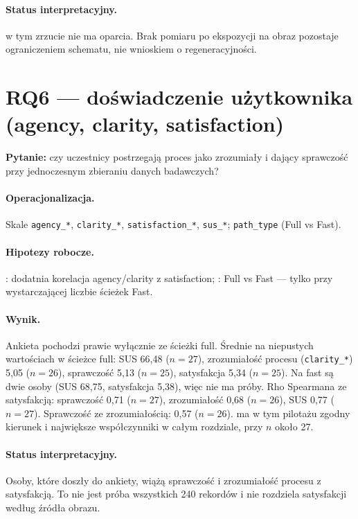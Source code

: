 \paragraph{Status interpretacyjny.}
 w tym zrzucie nie ma oparcia. Brak pomiaru po ekspozycji na obraz pozostaje ograniczeniem schematu, nie wnioskiem o regeneracyjności.

\section{RQ6 --- doświadczenie użytkownika (agency, clarity, satisfaction)}
\label{ch08:sec:rq6}

\textbf{Pytanie:} czy uczestnicy postrzegają proces jako zrozumiały i dający sprawczość przy jednoczesnym zbieraniu danych badawczych?

\paragraph{Operacjonalizacja.}
Skale \texttt{agency\_*}, \texttt{clarity\_*}, \texttt{satisfaction\_*}, \texttt{sus\_*}; \texttt{path\_type} (Full vs Fast).

\paragraph{Hipotezy robocze.}
: dodatnia korelacja agency/clarity z satisfaction; : Full vs Fast --- tylko przy wystarczającej liczbie ścieżek Fast.

\paragraph{Wynik.}
Ankieta pochodzi prawie wyłącznie ze ścieżki full. Średnie na niepustych wartościach w ścieżce full: SUS 66,48 ($n=27$), zrozumiałość procesu (\texttt{clarity\_*}) 5,05 ($n=26$), sprawczość 5,13 ($n=25$), satysfakcja 5,34 ($n=25$). Na fast są dwie osoby (SUS 68,75, satysfakcja 5,38), więc  nie ma próby.
Rho Spearmana ze satysfakcją: sprawczość 0,71 ($n=27$), zrozumiałość 0,68 ($n=26$), SUS 0,77 ($n=27$). Sprawczość ze zrozumiałością: 0,57 ($n=26$).  ma w tym pilotażu zgodny kierunek i największe współczynniki w całym rozdziale, przy $n$ około 27.

\paragraph{Status interpretacyjny.}
Osoby, które doszły do ankiety, wiążą sprawczość i zrozumiałość procesu z satysfakcją. To nie jest próba wszystkich 240 rekordów i nie rozdziela satysfakcji według źródła obrazu.

